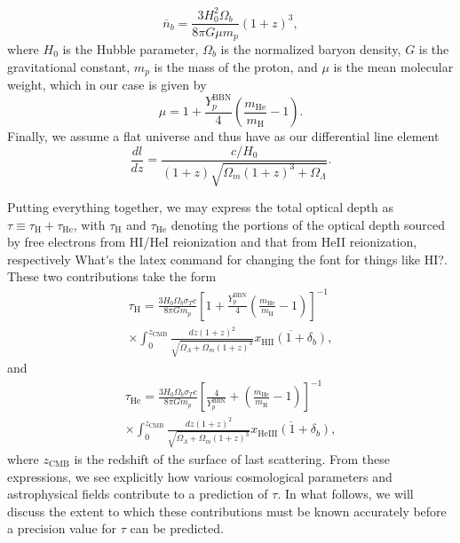 \documentclass[twocolumn,aps,prd,nofootinbib,showpacs]{revtex4-1}
\begin{document}
\begin{equation}
\overline{n}_b = \frac{3 H_0^2 \Omega_b}{8 \pi G \mu m_p} (1+z)^3,
\end{equation}
where $H_0$ is the Hubble parameter, $\Omega_b$ is the normalized baryon density, $G$ is the gravitational constant, $m_p$ is the mass of the proton, and $\mu$ is the mean molecular weight, which in our case is given by
\begin{equation}
\mu = 1 + \frac{Y_p^\textrm{BBN}}{4} \left( \frac{m_\textrm{He}}{m_\textrm{H}} - 1\right).
\end{equation}
Finally, we assume a flat universe and thus have as our differential line element
\begin{equation}
\frac{dl}{dz} =  \frac{c/H_0}{(1+z) \sqrt{\Omega_m (1+z)^3 + \Omega_\Lambda}}.
\end{equation}

Putting everything together, we may express the total optical depth as $\tau \equiv \tau_\textrm{H} + \tau_\textrm{He}$, with $\tau_\textrm{H}$ and $\tau_\textrm{He}$ denoting the portions of the optical depth sourced by free electrons from HI/HeI reionization and that from HeII reionization, respectively \acl{What's the latex command for changing the font for things like HI?}. These two contributions take the form
\begin{eqnarray}
\label{eq:tauH}
\tau_\textrm{H} = \frac{3 H_0 \Omega_b \sigma_Tc}{8 \pi G m_p} \left[ 1 + \frac{Y_p^\textrm{BBN}}{4}\left( \frac{m_\textrm{He}}{m_\textrm{H}} - 1\right)\right]^{-1} \nonumber \\
\times \int_0^{z_\textrm{CMB}} \frac{dz (1+z)^2}{\sqrt{\Omega_\Lambda + \Omega_m (1+z)^3}}  \overline{x_\textrm{HII} (1+\delta_b)},
\end{eqnarray} 
and
\begin{eqnarray}
\label{eq:tauHe}
\tau_\textrm{He} = \frac{3 H_0 \Omega_b \sigma_Tc}{8 \pi G m_p} \left[ \frac{4}{Y_p^\textrm{BBN}} + \left( \frac{m_\textrm{He}}{m_\textrm{H}} - 1\right)\right]^{-1} \nonumber \\
\times \int_0^{z_\textrm{CMB}} \frac{dz (1+z)^2}{\sqrt{\Omega_\Lambda + \Omega_m (1+z)^3}}  \overline{x_\textrm{HeIII} (1+\delta_b)},
\end{eqnarray}
where $z_\textrm{CMB}$ is the redshift of the surface of last scattering. From these expressions, we see explicitly how various cosmological parameters and astrophysical fields contribute to a prediction of $\tau$. In what follows, we will discuss the extent to which these contributions must be known accurately before a precision value for $\tau$ can be predicted.
\end{document}
